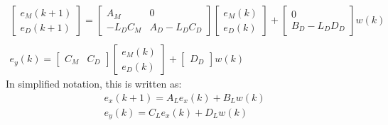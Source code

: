 \documentclass[a4paper]{article}
\begin{document}
\begin{equation}
\begin{matrix}
\begin{bmatrix}
e_M(k+1) \\ e_D(k+1)
\end{bmatrix}
=
\begin{bmatrix}
A_M & 0 \\
-L_DC_M & A_D-L_DC_D
\end{bmatrix}
\begin{bmatrix}
e_M(k) \\ e_D(k)
\end{bmatrix}
+
\begin{bmatrix}
0 \\ B_D-L_DD_D
\end{bmatrix}w(k)\\ \\
e_y(k) = 
\begin{bmatrix}
C_M & C_D
\end{bmatrix}
\begin{bmatrix}
e_M(k) \\ e_D(k)
\end{bmatrix}
+
\begin{bmatrix}
D_D
\end{bmatrix}w(k)
\end{matrix}
\label{estimator_error}
\end{equation}
In simplified notation, this is written as:
\begin{equation}
\begin{matrix}
e_x(k+1) = A_Le_x(k)+B_Lw(k) \\
e_y(k) = C_Le_x(k)+D_Lw(k) 
\end{matrix}
\end{equation}
\end{document}
